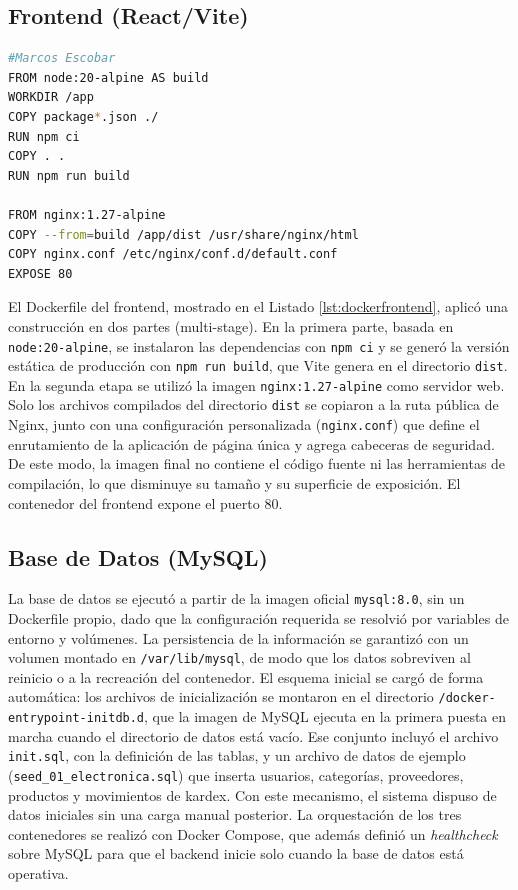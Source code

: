 \documentclass[stu,11pt,spanish,floatsintext]{apa7}
\begin{document}
\subsection{Frontend (React/Vite)}

\begin{lstlisting}[language=bash,caption={Dockerfile del Frontend (multi-stage)},label=lst:dockerfrontend]
#Marcos Escobar
FROM node:20-alpine AS build
WORKDIR /app
COPY package*.json ./
RUN npm ci
COPY . .
RUN npm run build

FROM nginx:1.27-alpine
COPY --from=build /app/dist /usr/share/nginx/html
COPY nginx.conf /etc/nginx/conf.d/default.conf
EXPOSE 80
\end{lstlisting}

El Dockerfile del frontend, mostrado en el Listado \ref{lst:dockerfrontend}, aplicó una construcción en dos partes (multi-stage). En la primera parte, basada en \texttt{node:20-alpine}, se instalaron las dependencias con \texttt{npm ci} y se generó la versión estática de producción con \texttt{npm run build}, que Vite genera en el directorio \texttt{dist}. En la segunda etapa se utilizó la imagen \texttt{nginx:1.27-alpine} como servidor web. Solo los archivos compilados del directorio \texttt{dist} se copiaron a la ruta pública de Nginx, junto con una configuración personalizada (\texttt{nginx.conf}) que define el enrutamiento de la aplicación de página única y agrega cabeceras de seguridad. De este modo, la imagen final no contiene el código fuente ni las herramientas de compilación, lo que disminuye su tamaño y su superficie de exposición. El contenedor del frontend expone el puerto 80.

\subsection{Base de Datos (MySQL)}

La base de datos se ejecutó a partir de la imagen oficial \texttt{mysql:8.0}, sin un Dockerfile propio, dado que la configuración requerida se resolvió por variables de entorno y volúmenes. La persistencia de la información se garantizó con un volumen montado en \texttt{/var/lib/mysql}, de modo que los datos sobreviven al reinicio o a la recreación del contenedor. El esquema inicial se cargó de forma automática: los archivos de inicialización se montaron en el directorio \texttt{/docker-entrypoint-initdb.d}, que la imagen de MySQL ejecuta en la primera puesta en marcha cuando el directorio de datos está vacío. Ese conjunto incluyó el archivo \texttt{init.sql}, con la definición de las tablas, y un archivo de datos de ejemplo (\texttt{seed\_01\_electronica.sql}) que inserta usuarios, categorías, proveedores, productos y movimientos de kardex. Con este mecanismo, el sistema dispuso de datos iniciales sin una carga manual posterior. La orquestación de los tres contenedores se realizó con Docker Compose, que además definió un \textit{healthcheck} sobre MySQL para que el backend inicie solo cuando la base de datos está operativa.
\end{document}

